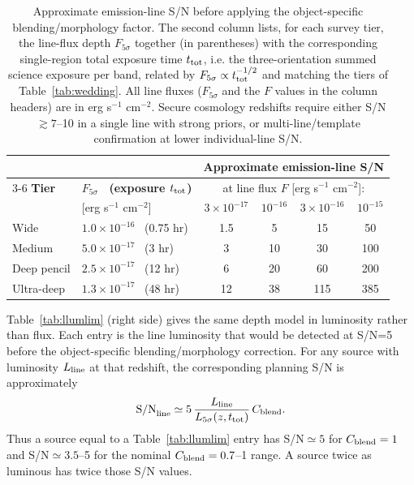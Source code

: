 \documentclass[10pt,onecolumn]{article}
\begin{document}
\begin{table}[tp]
\centering
\sffamily\small
\begin{tabularx}{\textwidth}{@{}p{2.3cm}p{3.3cm}c c c c@{}}
\toprule
 & & \multicolumn{4}{c}{\textbf{Approximate emission-line S/N}}\\
\cmidrule(lr){3-6}
\textbf{Tier} & \textbf{$F_{5\sigma}$ \ (exposure $t_{\rm tot}$)} & \multicolumn{4}{c}{at line flux $F$ [erg s$^{-1}$ cm$^{-2}$]:}\\
 & [erg s$^{-1}$ cm$^{-2}$] & $3\times10^{-17}$ & $10^{-16}$ & $3\times10^{-16}$ & $10^{-15}$\\
\midrule
Wide & $1.0\times10^{-16}$ \ (0.75 hr) & 1.5 & 5 & 15 & 50\\
Medium & $5.0\times10^{-17}$ \ (3 hr) & 3 & 10 & 30 & 100\\
Deep pencil & $2.5\times10^{-17}$ \ (12 hr) & 6 & 20 & 60 & 200\\
Ultra-deep & $1.3\times10^{-17}$ \ (48 hr) & 12 & 38 & 115 & 385\\
\bottomrule
\end{tabularx}
\caption{Approximate emission-line S/N before applying the object-specific blending/morphology factor. The second column lists, for each survey tier, the line-flux depth $F_{5\sigma}$ together (in parentheses) with the corresponding single-region total exposure time $t_{\rm tot}$, i.e. the three-orientation summed science exposure per band, related by $F_{5\sigma}\propto t_{\rm tot}^{-1/2}$ and matching the tiers of Table~\ref{tab:wedding}. All line fluxes ($F_{5\sigma}$ and the $F$ values in the column headers) are in erg s$^{-1}$ cm$^{-2}$. Secure cosmology redshifts require either S/N $\gtrsim7$--10 in a single line with strong priors, or multi-line/template confirmation at lower individual-line S/N.}
\label{tab:snrelg}
\end{table}

Table~\ref{tab:llumlim} (right side) gives the same depth model in luminosity rather than flux. Each entry is the line luminosity that would be detected at S/N=5 before the object-specific blending/morphology correction. For any source with luminosity $L_{\rm line}$ at that redshift, the corresponding planning S/N is approximately
\begin{equation}
  {\rm S/N}_{\rm line}\simeq
  5\,\frac{L_{\rm line}}{L_{5\sigma}(z,t_{\rm tot})}\,C_{\rm blend}.
\end{equation}
Thus a source equal to a Table~\ref{tab:llumlim} entry has S/N$\simeq5$ for $C_{\rm blend}=1$ and S/N$\simeq3.5$--5 for the nominal $C_{\rm blend}=0.7$--1 range. A source twice as luminous has twice those S/N values.
\end{document}

